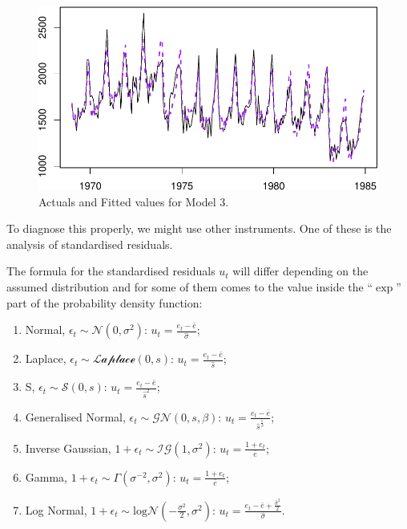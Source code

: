 \documentclass[
]{book}
\providecommand{\tightlist}{%
  \setlength{\itemsep}{0pt}\setlength{\parskip}{0pt}}
\theoremstyle{definition}
\theoremstyle{definition}
\theoremstyle{definition}
\theoremstyle{definition}
\theoremstyle{remark}
\begin{document}
\begin{figure}
\centering
\includegraphics{Svetunkov--2022----ADAM_files/figure-latex/adamSeat03LinearPlot-1.pdf}
\caption{\label{fig:adamSeat03LinearPlot}Actuals and Fitted values for Model 3.}
\end{figure}

To diagnose this properly, we might use other instruments. One of these is the analysis of standardised residuals.

The formula for the standardised residuals \(u_t\) will differ depending on the assumed distribution and for some of them comes to the value inside the ``\(\exp\)'' part of the probability density function:

\begin{enumerate}
\def\labelenumi{\arabic{enumi}.}
\tightlist
\item
  Normal, \(\epsilon_t \sim \mathcal{N}(0, \sigma^2)\): \(u_t = \frac{e_t -\bar{e}}{\hat{\sigma}}\);
\item
  Laplace, \(\epsilon_t \sim \mathcal{Laplace}(0, s)\): \(u_t = \frac{e_t -\bar{e}}{\hat{s}}\);
\item
  S, \(\epsilon_t \sim \mathcal{S}(0, s)\): \(u_t = \frac{e_t -\bar{e}}{\hat{s}^2}\);
\item
  Generalised Normal, \(\epsilon_t \sim \mathcal{GN}(0, s, \beta)\): \(u_t = \frac{e_t -\bar{e}}{\hat{s}^{\frac{1}{\beta}}}\);
\item
  Inverse Gaussian, \(1+\epsilon_t \sim \mathcal{IG}(1, \sigma^2)\): \(u_t = \frac{1+e_t}{\bar{e}}\);
\item
  Gamma, \(1+\epsilon_t \sim \mathcal{\Gamma}(\sigma^{-2}, \sigma^2)\): \(u_t = \frac{1+e_t}{\bar{e}}\);
\item
  Log Normal, \(1+\epsilon_t \sim \mathrm{log}\mathcal{N}\left(-\frac{\sigma^2}{2}, \sigma^2\right)\): \(u_t = \frac{e_t -\bar{e} +\frac{\hat{\sigma}^2}{2}}{\hat{\sigma}}\).
\end{enumerate}
\end{document}
